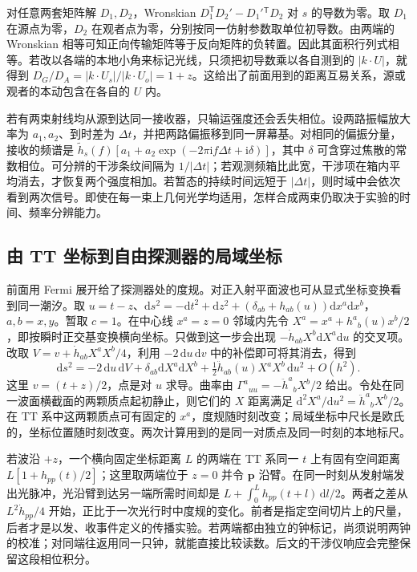 对任意两套矩阵解 $D_1,D_2$，Wronskian $D_1^{\mathsf T}D_2'-D_1'{}^{\mathsf T}D_2$ 对 $s$ 的导数为零。取 $D_1$ 在源点为零，$D_2$ 在观者点为零，分别按同一仿射参数取单位初导数。由两端的 Wronskian 相等可知正向传输矩阵等于反向矩阵的负转置。因此其面积行列式相等。若改以各端的本地小角来标记光线，只须把初导数乘以各自测到的 $|k\cdot U|$，就得到 $D_G/D_A=|k\cdot U_s|/|k\cdot U_o|=1+z$。这给出了前面用到的距离互易关系，源或观者的本动包含在各自的 $U$ 内。

若有两束射线均从源到达同一接收器，只输运强度还会丢失相位。设两路振幅放大率为 $a_1,a_2$、到时差为 $\Delta t$，并把两路偏振移到同一屏幕基。对相同的偏振分量，接收的频谱是 $\widetilde h_s(f)[a_1+a_2\exp(-2\pi\mathrm i f\Delta t+\mathrm i\delta)]$，其中 $\delta$ 可含穿过焦散的常数相位。可分辨的干涉条纹间隔为 $1/|\Delta t|$；若观测频箱比此宽，干涉项在箱内平均消去，才恢复两个强度相加。若暂态的持续时间远短于 $|\Delta t|$，则时域中会依次看到两次信号。即使在每一束上几何光学均适用，怎样合成两束仍取决于实验的时间、频率分辨能力。

\subsection{由 TT 坐标到自由探测器的局域坐标}

前面用 Fermi 展开给了探测器处的度规。对正入射平面波也可从显式坐标变换看到同一潮汐。取 $u=t-z$、$\mathrm ds^2=-\mathrm dt^2+\mathrm dz^2+(\delta_{ab}+h_{ab}(u))\mathrm dx^a\mathrm dx^b$，$a,b=x,y$。暂取 $c=1$。在中心线 $x^a=z=0$ 邻域内先令 $X^a=x^a+h^a{}_b(u)x^b/2$，即按瞬时正交基变换横向坐标。只做到这一步会出现 $-\dot h_{ab}X^b\mathrm dX^a\mathrm du$ 的交叉项。改取 $V=v+\dot h_{ab}X^aX^b/4$，利用 $-2\,\mathrm du\,\mathrm dv$ 中的补偿即可将其消去，得到
\[
 \mathrm ds^2=-2\,\mathrm du\,\mathrm dV+\delta_{ab}\mathrm dX^a\mathrm dX^b
          +\tfrac12\ddot h_{ab}(u)X^aX^b\,\mathrm du^2+O(h^2).
\]
这里 $v=(t+z)/2$，点是对 $u$ 求导。曲率由 $\Gamma^a{}_{uu}=-\ddot h^a{}_bX^b/2$ 给出。令处在同一波面横截面的两颗质点起初静止，则它们的 $X$ 距离满足 $\mathrm d^2X^a/\mathrm du^2=\ddot h^a{}_bX^b/2$。在 TT 系中这两颗质点可有固定的 $x^a$，度规随时刻改变；局域坐标中尺长是欧氏的，坐标位置随时刻改变。两次计算用到的是同一对质点及同一时刻的本地标尺。

若波沿 $+z$，一个横向固定坐标距离 $L$ 的两端在 TT 系同一 $t$ 上有固有空间距离 $L[1+h_{pp}(t)/2]$；这里取两端位于 $z=0$ 并令 $\bm p$ 沿臂。在同一时刻从发射端发出光脉冲，光沿臂到达另一端所需时间却是 $L+\int_0^L h_{pp}(t+l)\,\mathrm dl/2$。两者之差从 $L^2\dot h_{pp}/4$ 开始，正比于一次光行时中度规的变化。前者是指定空间切片上的尺量，后者才是以发、收事件定义的传播实验。若两端都由独立的钟标记，尚须说明两钟的校准；对同端往返用同一只钟，就能直接比较读数。后文的干涉仪响应会完整保留这段相位积分。

